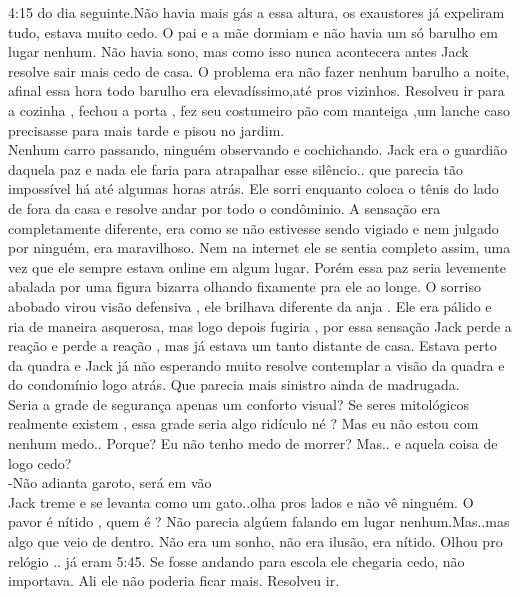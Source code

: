 \documentclass{book}
\begin{document}
 4:15 do dia seguinte.Não havia mais gás a essa altura, os exaustores já expeliram tudo, estava muito cedo. O pai e a mãe dormiam e não havia um só barulho em lugar nenhum. Não havia sono, mas como isso nunca acontecera antes Jack resolve sair mais cedo de casa. O problema era não fazer nenhum barulho a noite, afinal essa hora todo barulho era elevadíssimo,até pros vizinhos. Resolveu ir para a cozinha , fechou a porta , fez seu costumeiro pão com manteiga ,um lanche caso precisasse para mais tarde e pisou no jardim. \\
 Nenhum carro passando, ninguém observando e cochichando. Jack era o guardião daquela paz e nada ele faria para atrapalhar esse silêncio.. que parecia tão impossível há até algumas horas atrás. Ele sorri enquanto coloca o tênis do lado de fora da casa e resolve andar por todo o condôminio. A sensação era completamente diferente, era como se não estivesse sendo vigiado e nem julgado por ninguém, era maravilhoso. Nem na internet ele se sentia completo assim, uma vez que ele sempre estava online em algum lugar. Porém essa paz seria levemente abalada por uma figura bizarra olhando fixamente pra ele ao longe. O sorriso abobado virou visão defensiva , ele brilhava diferente da anja . Ele era pálido e ria de maneira asquerosa, mas logo depois fugiria , por essa sensação Jack perde a reação e perde a reação , mas já estava um tanto distante de casa. Estava perto da quadra e Jack já não esperando muito resolve contemplar a visão da quadra e do condomínio logo atrás. Que parecia mais sinistro ainda de madrugada. \\
 
 Seria a grade de segurança apenas um conforto visual? Se seres mitológicos realmente existem , essa grade seria algo ridículo né ? Mas eu não estou com nenhum medo.. Porque? Eu não tenho medo de morrer? Mas.. e aquela coisa de logo cedo? \\
 
 -Não adianta garoto, será em vão\\
 
 Jack treme e se levanta como um gato..olha pros lados e não vê ninguém. O pavor é nítido , quem é ? Não parecia algúem falando em lugar nenhum.Mas..mas algo que veio de dentro. Não era um sonho, não era ilusão, era nítido. Olhou pro relógio .. já eram 5:45. Se fosse andando para escola ele chegaria cedo, não importava. Ali ele não poderia ficar mais. Resolveu ir.\\
 
\end{document}
